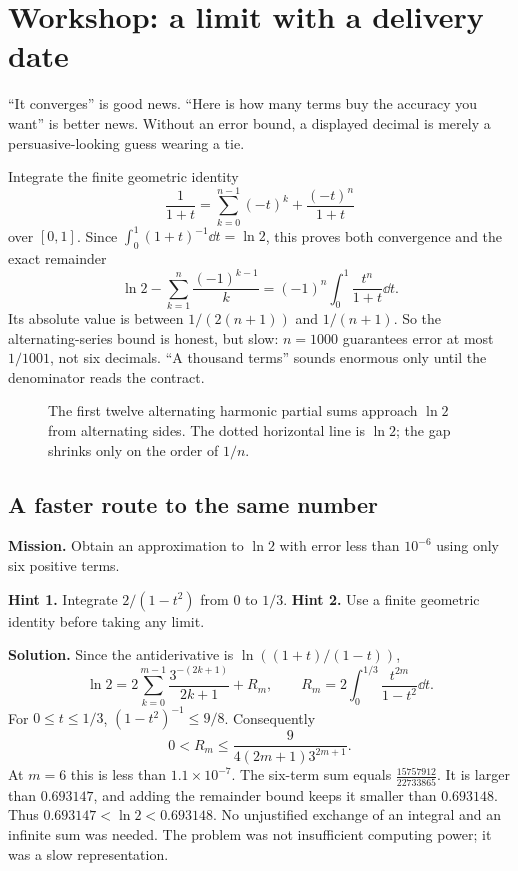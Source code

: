 \section{Workshop: a limit with a delivery date}
``It converges'' is good news. ``Here is how many terms buy the accuracy you want'' is better news. Without an error bound, a displayed decimal is merely a persuasive-looking guess wearing a tie.

\begin{examplex}
Integrate the finite geometric identity
\[
\frac1{1+t}=\sum_{k=0}^{n-1}(-t)^k+\frac{(-t)^n}{1+t}
\]
over $[0,1]$. Since $\int_0^1(1+t)^{-1}\dd t=\ln2$, this proves both convergence and the exact remainder
\[
\ln2-\sum_{k=1}^n\frac{(-1)^{k-1}}k
=(-1)^n\int_0^1\frac{t^n}{1+t}\dd t.
\]
Its absolute value is between $1/(2(n+1))$ and $1/(n+1)$. So the alternating-series bound is honest, but slow: $n=1000$ guarantees error at most $1/1001$, not six decimals. ``A thousand terms'' sounds enormous only until the denominator reads the contract.
\end{examplex}

\begin{figure}[ht]\centering{}
\caption{The first twelve alternating harmonic partial sums approach $\ln2$ from alternating sides. The dotted horizontal line is $\ln2$; the gap shrinks only on the order of $1/n$.}\end{figure}

\subsection*{A faster route to the same number}
\textbf{Mission.} Obtain an approximation to $\ln2$ with error less than $10^{-6}$ using only six positive terms.

\textbf{Hint 1.} Integrate $2/(1-t^2)$ from $0$ to $1/3$. \textbf{Hint 2.} Use a finite geometric identity before taking any limit.

\textbf{Solution.} Since the antiderivative is $\ln((1+t)/(1-t))$,
\[
\ln2=2\sum_{k=0}^{m-1}\frac{3^{-(2k+1)}}{2k+1}+R_m,
\qquad
R_m=2\int_0^{1/3}\frac{t^{2m}}{1-t^2}\dd t.
\]
For $0\le t\le1/3$, $(1-t^2)^{-1}\le9/8$. Consequently
\[
0<R_m\le\frac{9}{4(2m+1)3^{2m+1}}.
\]
At $m=6$ this is less than $1.1\times10^{-7}$. The six-term sum equals $\frac{15757912}{22733865}$. It is larger than $0.693147$, and adding the remainder bound keeps it smaller than $0.693148$. Thus $0.693147<\ln2<0.693148$. No unjustified exchange of an integral and an infinite sum was needed. The problem was not insufficient computing power; it was a slow representation.

